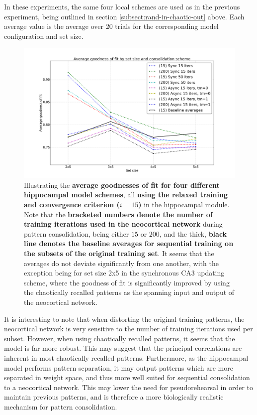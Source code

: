In these experiments, the same four local schemes are used as in the previous experiment, being outlined in section \ref{subsect:rand-in-chaotic-out} above. Each average value is the average over 20 trials for the corresponding model configuration and set size.


\begin{figure}
    \centering
    \includegraphics[width=14cm]{fig/neo-consolidation/consolidation-IO-span-all-with-baseline}
    \caption{Illustrating the \textbf{average goodnesses of fit for four different hippocampal model schemes}, all \textbf{using the relaxed training and convergence criterion ($i=15$)} in the hippocampal module. Note that the \textbf{bracketed numbers denote the number of training iterations used in the neocortical network} during pattern consolidation, being either $15$ or $200$, and the thick, \textbf{black line denotes the baseline averages for sequential training on the subsets of the original training set}. It seems that the averages do not deviate significantly from one another, with the exception being for set size 2x5 in the synchronous CA3 updating scheme, where the goodness of fit is significantly improved by using the chaotically recalled patterns as the spanning input and output of the neocortical network.}
    \label{fig:consolidation-IO-span-all-with-baseline}
\end{figure}

It is interesting to note that when distorting the original training patterns, the neocortical network is very sensitive to the number of training iterations used per subset.
However, when using chaotically recalled patterns, it seems that the model is far more robust. This may suggest that the principal correlations are inherent in most chaotically recalled patterns. 
Furthermore, as the hippocampal model performs pattern separation, it may output patterns which are more separated in weight space, and thus more well suited for sequential consolidation to a neocortical network. This may lower the need for pseudorehearsal in order to maintain previous patterns, and is therefore a more biologically realistic mechanism for pattern consolidation. 

